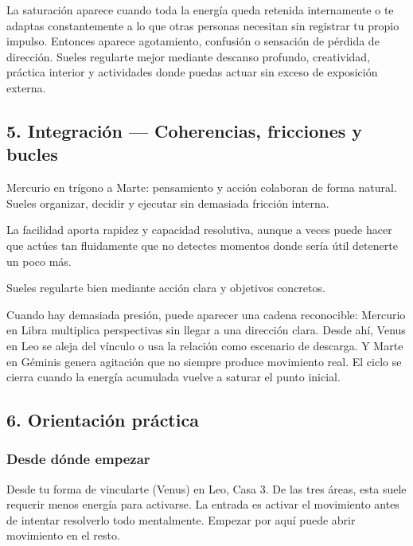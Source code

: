 \documentclass[11pt,a4paper]{article}
\begin{document}
La saturación aparece cuando toda la energía queda retenida internamente o te adaptas constantemente a lo que otras personas necesitan sin registrar tu propio impulso. Entonces aparece agotamiento, confusión o sensación de pérdida de dirección. Sueles regularte mejor mediante descanso profundo, creatividad, práctica interior y actividades donde puedas actuar sin exceso de exposición externa.

\vspace{0.8cm}

\subsection{5. Integración — Coherencias, fricciones y bucles}

\justifying
Mercurio en trígono a Marte: pensamiento y acción colaboran de forma natural. Sueles organizar, decidir y ejecutar sin demasiada fricción interna.

La facilidad aporta rapidez y capacidad resolutiva, aunque a veces puede hacer que actúes tan fluidamente que no detectes momentos donde sería útil detenerte un poco más.

Sueles regularte bien mediante acción clara y objetivos concretos.

Cuando hay demasiada presión, puede aparecer una cadena reconocible: Mercurio en Libra multiplica perspectivas sin llegar a una dirección clara. Desde ahí, Venus en Leo se aleja del vínculo o usa la relación como escenario de descarga. Y Marte en Géminis genera agitación que no siempre produce movimiento real. El ciclo se cierra cuando la energía acumulada vuelve a saturar el punto inicial.

\vspace{0.8cm}

\subsection{6. Orientación práctica}

\subsubsection*{Desde dónde empezar}

\justifying
Desde tu forma de vincularte (Venus) en Leo, Casa 3. De las tres áreas, esta suele requerir menos energía para activarse. La entrada es activar el movimiento antes de intentar resolverlo todo mentalmente. Empezar por aquí puede abrir movimiento en el resto.
\end{document}
